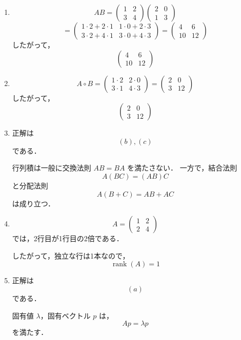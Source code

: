 \documentclass[uplatex,a4paper,12pt]{jsarticle}
\begin{document}
\begin{enumerate}
\item
\[
AB=
\begin{pmatrix}
1&2\\
3&4
\end{pmatrix}
\begin{pmatrix}
2&0\\
1&3
\end{pmatrix}
\]
\[
=
\begin{pmatrix}
1\cdot2+2\cdot1 & 1\cdot0+2\cdot3\\
3\cdot2+4\cdot1 & 3\cdot0+4\cdot3
\end{pmatrix}
=
\begin{pmatrix}
4&6\\
10&12
\end{pmatrix}
\]
したがって，
\[
\boxed{
\begin{pmatrix}
4&6\\
10&12
\end{pmatrix}
}
\]

\item
\[
A\circ B=
\begin{pmatrix}
1\cdot2 & 2\cdot0\\
3\cdot1 & 4\cdot3
\end{pmatrix}
=
\begin{pmatrix}
2&0\\
3&12
\end{pmatrix}
\]
したがって，
\[
\boxed{
\begin{pmatrix}
2&0\\
3&12
\end{pmatrix}
}
\]

\item
正解は
\[
\boxed{(b),(c)}
\]
である．

行列積は一般に交換法則 $AB=BA$ を満たさない．
一方で，結合法則
\[
A(BC)=(AB)C
\]
と分配法則
\[
A(B+C)=AB+AC
\]
は成り立つ．

\item
\[
A=
\begin{pmatrix}
1&2\\
2&4
\end{pmatrix}
\]
では，2行目が1行目の2倍である．

したがって，独立な行は1本なので，
\[
\boxed{\operatorname{rank}(A)=1}
\]

\item
正解は
\[
\boxed{(a)}
\]
である．

固有値 $\lambda$，固有ベクトル $p$ は，
\[
Ap=\lambda p
\]
を満たす．

\end{enumerate}
\end{document}

